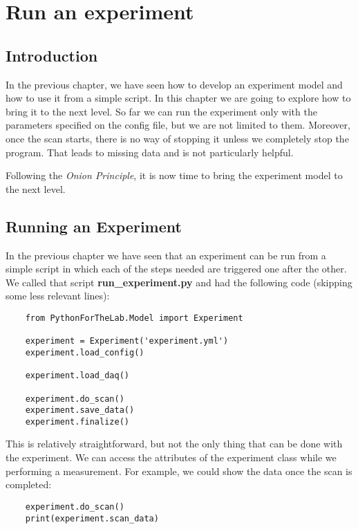 \chapter{Run an experiment}\label{chapter:run-experiment}


\section{Introduction}
In the previous chapter, we have seen how to develop an experiment model and how to use it from a simple script. In this chapter we are going to explore how to bring it to the next level. So far we can run the experiment only with the parameters specified on the config file, but we are not limited to them. Moreover, once the scan starts, there is no way of stopping it unless we completely stop the program. That leads to missing data and is not particularly helpful.

Following the \emph{Onion Principle}, it is now time to bring the experiment model to the next level.


\section{Running an Experiment}\label{sec:running-experiment}
In the previous chapter we have seen that an experiment can be run from a simple script in which each of the steps needed are triggered one after the other. We called that script \textbf{run\_experiment.py} and had the following code (skipping some less relevant lines):

\begin{verbatim}
    from PythonForTheLab.Model import Experiment

    experiment = Experiment('experiment.yml')
    experiment.load_config()

    experiment.load_daq()

    experiment.do_scan()
    experiment.save_data()
    experiment.finalize()
\end{verbatim}

This is relatively straightforward, but not the only thing that can be done with the experiment. We can access the attributes of the experiment class while we performing a measurement. For example, we could show the data once the scan is completed:

\begin{verbatim}
    experiment.do_scan()
    print(experiment.scan_data)
\end{verbatim}

